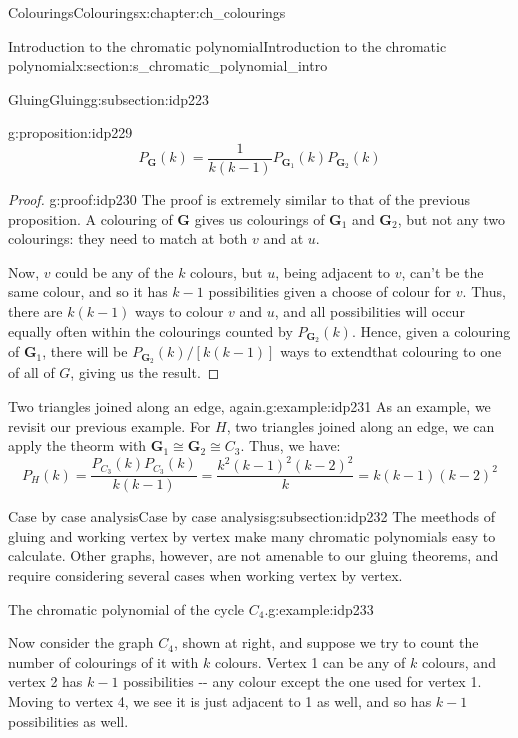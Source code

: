 \documentclass[oneside,10pt,]{book}
\numberwithin{equation}{section}
\newcommand{\bfG}{\mathbf{G}}
\begin{document}
\begin{chapterptx}{Colourings}{}{Colourings}{}{}{x:chapter:ch_colourings}
\begin{sectionptx}{Introduction to the chromatic polynomial}{}{Introduction to the chromatic polynomial}{}{}{x:section:s_chromatic_polynomial_intro}
\begin{subsectionptx}{Gluing}{}{Gluing}{}{}{g:subsection:idp223}
\begin{proposition}{}{}{g:proposition:idp229}
%
\begin{equation*}
P_{\bfG}(k)=\frac{1}{k(k-1)}P_{\bfG_1}(k)P_{\bfG_2}(k)
\end{equation*}
\end{proposition}
\begin{proof}{}{g:proof:idp230}
The proof is extremely similar to that of the previous proposition.  A colouring of \(\bfG\) gives us colourings of \(\bfG_1\) and \(\bfG_2\), but not any two colourings: they need to match at both \(v\) and at \(u\).%
\par
Now, \(v\) could be any of the \(k\) colours, but \(u\), being adjacent to \(v\), can't be the same colour, and so it has \(k-1\) possibilities given a choose of colour for \(v\).  Thus, there are \(k(k-1)\) ways to colour \(v\) and \(u\), and all possibilities will occur equally often within the colourings counted by \(P_{\bfG_2}(k)\).  Hence, given a colouring of \(\bfG_1\), there will be \(P_{\bfG_2}(k)/[k(k-1)]\) ways to extendthat colouring to one of all of \(G\), giving us the result.%
\end{proof}
\begin{example}{Two triangles joined along an edge, again.}{g:example:idp231}%
As an example, we revisit our previous example.  For \(H\), two triangles joined along an edge, we can apply the theorm with \(\bfG_1\cong \bfG_2\cong C_3\).  Thus, we have:%
%
\begin{equation*}
P_H(k)=\frac{P_{C_3}(k)P_{C_3}(k)}{k(k-1)}=\frac{k^2(k-1)^2(k-2)^2}{k}=k(k-1)(k-2)^2
\end{equation*}
\end{example}
\end{subsectionptx}
%
%
\typeout{************************************************}
\typeout{************************************************}
%
\begin{subsectionptx}{Case by case analysis}{}{Case by case analysis}{}{}{g:subsection:idp232}
The meethods of gluing and working vertex by vertex make many chromatic polynomials easy to calculate.  Other graphs, however, are not amenable to our gluing theorems, and require considering several cases when working vertex by vertex.%
\begin{example}{The chromatic polynomial of the cycle \(C_4\).}{g:example:idp233}%
\begin{sidebyside}{2}{0.025}{0.025}{0.05}%
\begin{sbspanel}{0.6}%
Now consider the graph \(C_4\), shown at right, and suppose we try to count the number of colourings of it with \(k\) colours.  Vertex 1 can be any of \(k\) colours, and vertex 2 has \(k-1\) possibilities -{}-{} any colour except the one used for vertex 1.  Moving to vertex 4, we see it is just adjacent to 1 as well, and so has \(k-1\) possibilities as well.%

\end{sbspanel}
\end{sidebyside}
\end{example}
\end{subsectionptx}
\end{sectionptx}
\end{chapterptx}
\end{document}
